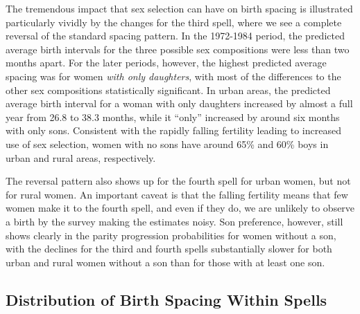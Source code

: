 \documentclass[12pt,letterpaper]{article}
\begin{document}
The tremendous impact that sex selection can have on birth spacing is illustrated 
particularly vividly by the changes for the third spell, where we see a complete reversal 
of the standard spacing pattern.
In the 1972-1984 period, the predicted average birth intervals for the three possible sex 
compositions were less than two months apart.
For the later periods, however, the highest predicted average spacing was for women
\emph{with only daughters}, with most of the differences to the other sex compositions 
statistically significant.
In urban areas, the predicted average birth interval for a woman with only daughters 
increased by almost a full year from 26.8 to 38.3 months, while it ``only'' increased
by around six months with only sons.
Consistent with the rapidly falling fertility leading to increased use of sex selection, 
women with no sons have around 65\% and 60\% boys in urban and rural areas, respectively.

The reversal pattern also shows up for the fourth spell for urban women, but not for rural 
women.
An important caveat is that the falling fertility means that few women make it to the 
fourth spell, and even if they do, we are unlikely to observe a birth by the survey making 
the estimates noisy.
Son preference, however, still shows clearly in the parity progression probabilities for 
women without a son, with the declines for the third and fourth spells substantially
slower for both urban and rural women without a son than for those with at least one son.




\subsection{Distribution of Birth Spacing Within Spells}
\end{document}
